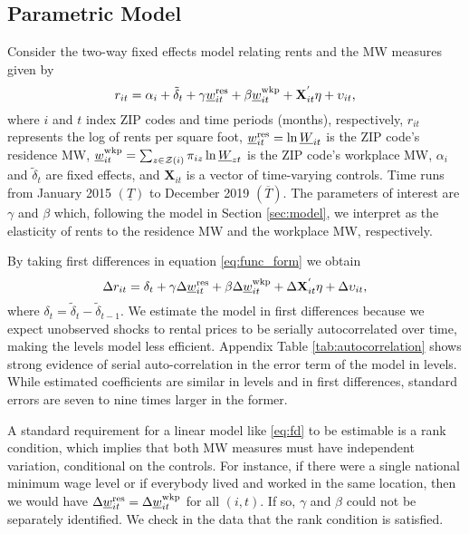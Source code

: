 \subsection{Parametric Model}

Consider the two-way fixed effects model relating rents and the MW measures
given by
\begin{equation} \label{eq:func_form}
    r_{it} = \alpha_i + \tilde{\delta}_t 
           + \gamma \underline{w}^{\text{res}}_{it} + \beta \underline{w}^{\text{wkp}}_{it}
           + \mathbf{X}^{'}_{it}\eta
           + \upsilon_{it} ,
\end{equation}    
where
$i$ and $t$ index ZIP codes and time periods (months), respectively,
$r_{it}$ represents the log of rents per square foot,
$\underline{w}^{\text{res}}_{it} = \ln \underline{W}_{it}$ is the ZIP code's residence MW,
$\underline{w}^{\text{wkp}}_{it} = \sum_{z\in\mathcal{Z}(i)} \pi_{iz}\ln \underline{W}_{zt}$ is the ZIP code's 
workplace MW,
$\alpha_i$ and $\tilde{\delta}_t$ are fixed effects, and 
$\mathbf{X}_{it}$ is a vector of time-varying controls.
Time runs from January 2015 $\left(\underline{T}\right)$ 
to December 2019 $\left(\overline{T}\right)$.
The parameters of interest are $\gamma$ and $\beta$ which, 
following the model in Section \ref{sec:model}, 
we interpret as the elasticity of rents to the residence MW and the workplace MW, 
respectively.

By taking first differences in equation \eqref{eq:func_form} we obtain
\begin{equation}\label{eq:fd}
    \Delta r_{it} = \delta_t
                  + \gamma \Delta \underline{w}^{\text{res}}_{it} + \beta \Delta \underline{w}^{\text{wkp}}_{it}
                  + \Delta \mathbf{X}^{'}_{it}\eta
                  + \Delta \upsilon_{it} ,
\end{equation}
where $\delta_t = \tilde{\delta}_t - \tilde{\delta}_{t-1}$.
We estimate the model in first differences because we expect unobserved shocks
to rental prices to be serially autocorrelated over time, making the levels
model less efficient.
Appendix Table \ref{tab:autocorrelation} shows strong evidence of serial 
auto-correlation in the error term of the model in levels.
While estimated coefficients are similar in levels and in first differences, 
standard errors are seven to nine times larger in the former.

A standard requirement for a linear model like \eqref{eq:fd} to be
estimable is a rank condition, which implies that both MW measures must have 
independent variation, conditional on the controls.
For instance, if there were a single national minimum wage level or if everybody 
lived and worked in the same location, then we would have
$\Delta \underline{w}^{\text{res}}_{it} = \Delta \underline{w}^{\text{wkp}}_{it}$ for all $(i,t)$.
If so, $\gamma$ and $\beta$ could not be separately identified.
We check in the data that the rank condition is satisfied.

